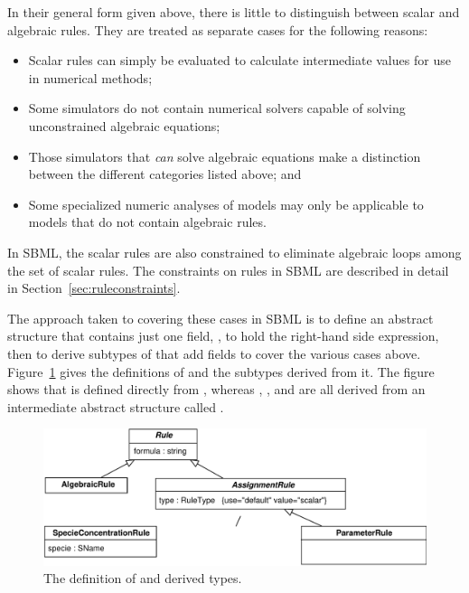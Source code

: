 \documentclass[10pt]{cekarticle}
\newcommand{\vref}[1]{\ref{#1}}
\newenvironment{blockChanged}{\color{BrickRed}}{}
\begin{document}
\begin{blockChanged}
In their general form given above, there is little to distinguish between
scalar and algebraic rules.  They are treated as separate cases for the
following reasons:
\begin{itemize}
  
\item Scalar rules can simply be evaluated to calculate intermediate
  values for use in numerical methods;
  
\item Some simulators do not contain numerical solvers capable of solving
  unconstrained algebraic equations;
  
\item Those simulators that \emph{can} solve algebraic equations make a
  distinction between the different categories listed above; and
  
\item Some specialized numeric analyses of models may only be applicable to
  models that do not contain algebraic rules.
\end{itemize}

In SBML, the scalar rules are also constrained to eliminate algebraic loops
among the set of scalar rules.  The constraints on rules in SBML are
described in detail in Section~\ref{sec:ruleconstraints}.

The approach taken to covering these cases in SBML is to define an abstract
 structure that contains just one field, , to
hold the right-hand side expression, then to derive subtypes of
 that add fields to cover the various cases above.
Figure~\vref{fig:rules} gives the definitions of  and the
subtypes derived from it.  The figure shows that  is
defined directly from , whereas ,
, and  are all derived
from an intermediate abstract structure called .

\begin{figure}[htb]
  \centering
  \includegraphics[scale = 0.68]{rule}
  \caption{The definition of  and derived types.}
  \label{fig:rules}
\end{figure}


\end{blockChanged}
\end{document}
